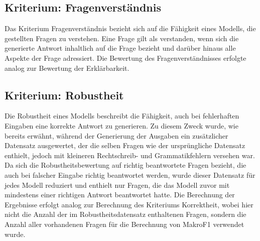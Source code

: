 \subsection{Kriterium: Fragenverständnis}
Das Kriterium Fragenverständnis bezieht sich auf die Fähigkeit eines Modells, die gestellten Fragen zu verstehen.
Eine Frage gilt als verstanden, wenn sich die generierte Antwort inhaltlich auf die Frage bezieht und darüber hinaus alle Aspekte der Frage adressiert.
Die Bewertung des Fragenverständnisses erfolgte analog zur Bewertung der Erklärbarkeit.

\subsection{Kriterium: Robustheit}
Die Robustheit eines Modells beschreibt die Fähigkeit, auch bei fehlerhaften Eingaben eine korrekte Antwort zu generieren.
Zu diesem Zweck wurde, wie bereits erwähnt, während der Generierung der Ausgaben ein zusätzlicher Datensatz ausgewertet, der die selben Fragen wie der ursprüngliche Datensatz enthielt, jedoch mit kleineren Rechtschreib- und Grammatikfehlern versehen war.
Da sich die Robustheitsbewertung auf richtig beantwortete Fragen bezieht, die auch bei falscher Eingabe richtig beantwortet werden, wurde dieser Datensatz für jedes Modell reduziert und enthielt nur Fragen, die das Modell zuvor mit mindestens einer richtigen Antwort beantwortet hatte.
Die Berechnung der Ergebnisse erfolgt analog zur Berechnung des Kriteriums Korrektheit, wobei hier nicht die Anzahl der im Robustheitsdatensatz enthaltenen Fragen, sondern die Anzahl aller vorhandenen Fragen für die Berechnung von MakroF1 verwendet wurde.
